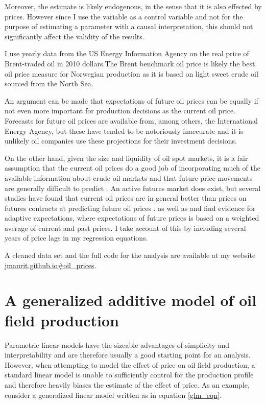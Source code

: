 \documentclass[11pt]{article}
\begin{document}
Moreover, the estimate is likely endogenous, in the sense that it is also effected by prices.  However since I use the variable as a control variable and not for the purpose of estimating a parameter with a causal interpretation, this should not significantly affect the validity of the results.  

I use yearly data from the US Energy Information Agency on the real price of Brent-traded oil in 2010 dollars.The Brent benchmark oil price is likely the best oil price measure for Norwegian production as it is based on light sweet crude oil sourced from the North Sea.  

An argument can be made that expectations of future oil prices can be equally if not even more important for production decisions as the current oil price.  Forecasts for future oil prices are available from, among others, the International Energy Agency, but these have tended to be notoriously inaccurate and it is unlikely oil companies use these projections for their investment decisions.  

On the other hand, given the size and liquidity of oil spot markets, it is a fair assumption that the current oil prices do a good job of incorporating much of the available information about crude oil markets and that future price movements are generally difficult to predict \citep{hamilton_understanding_2008}.  An active futures market does exist, but several studies have found that current oil prices are in general better than prices on futures contracts at predicting future oil prices \citep{alquist_what_2010, chinn_predictive_2005}.  \citet{mohn_investment_2008} as well as \citet{pesaran_econometric_1990} and \citet{farzin_impact_2001} find evidence for adaptive expectations, where expectations of future prices is based on a weighted average of current and past prices.  I take account of this by including several years of price lags in my regression equations.  

A cleaned data set and the full code for the analysis are available at my website \url{jmaurit.github.io#oil_prices}.

\section{A generalized additive model of oil field production}
Parametric linear models have the sizeable advantages of simplicity and interpretability and are therefore usually a good starting point for an analysis.  However, when attempting to model the effect of price on oil field production, a standard linear model is unable to sufficiently control for the production profile and therefore heavily biases the estimate of the effect of price.  As an example, consider a generalized linear model written as in equation \ref{glm_eqn}. 
\end{document}
